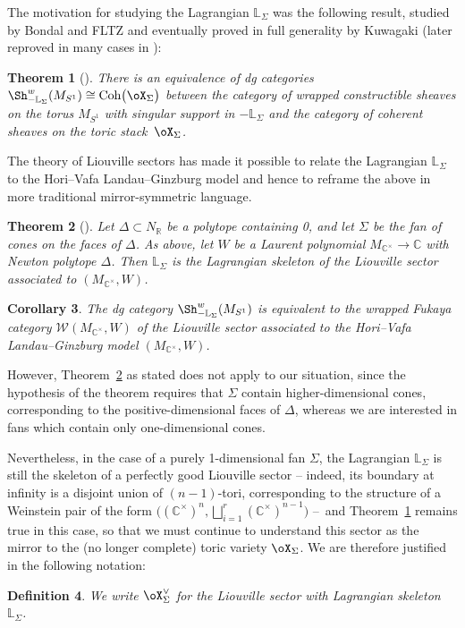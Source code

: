 \documentclass[10pt,a4paper]{amsart}
\numberwithin{equation}{section}
\newtheorem{Theorem}{Theorem}[section]
\newtheorem{Corollary}[Theorem]{Corollary}
\newtheorem{Definition}[Theorem]{Definition}
\def\CC{\mathbb{C}}
\def\LL{\mathbb{L}}
\def\RR{\mathbb{R}}
\def\cW{\mathcal{W}}
\newcommand{\Coh}{\textup{Coh}}
\begin{document}
The motivation for studying the Lagrangian $\LL_\Sigma$ was the following result, studied by Bondal and FLTZ and eventually proved in full generality by Kuwagaki (later reproved in many cases in \cite{Zhou-ccc}):
\begin{Theorem}[\cite{Ku}]\label{thm:ccc}
 There is an equivalence of dg categories $\Sh^w_{-\LL_\Sigma}(M_{S^1})\cong\Coh\big(\oX_\Sigma\big)$ between the category of wrapped constructible sheaves on the torus $M_{S^1}$ with singular support in $-\LL_\Sigma$ and the category of coherent sheaves on the toric stack~$\oX_\Sigma$.
\end{Theorem}

The theory of Liouville sectors has made it possible to relate the Lagrangian $\LL_\Sigma$ to the Hori--Vafa Landau--Ginzburg model and hence to reframe the above in more traditional mirror-symmetric language.
\begin{Theorem}[\cite{GS17,Zhou-skel}]\label{thm:hv-skel}
 Let $\Delta\subset N_\RR$ be a polytope containing 0, and let $\Sigma$ be the fan of cones on the faces of $\Delta$. As above, let $W$ be a Laurent polynomial $M_{\CC^\times}\to \CC$ with Newton polytope $\Delta$.
 Then $\LL_\Sigma$ is the Lagrangian skeleton of the Liouville sector associated to $(M_{\CC^\times},W)$.
\end{Theorem}

{\sloppy\begin{Corollary}
 The dg category $\Sh^w_{-\LL_\Sigma}(M_{S^1})$ is equivalent to the wrapped Fukaya category $\cW(M_{\CC^\times}, W)$ of the Liouville sector associated to the Hori--Vafa Landau--Ginzburg model $(M_{\CC^\times}, W)$.
\end{Corollary}}

However, Theorem~\ref{thm:hv-skel} as stated does not apply to our situation, since the hypothesis of the theorem requires that $\Sigma$ contain higher-dimensional cones, corresponding to the positive-dimensional faces of $\Delta$, whereas we are interested in fans which contain only one-dimensional cones.

Nevertheless, in the case of a purely 1-dimensional fan $\Sigma$, the Lagrangian $\LL_\Sigma$ is still the skeleton of a perfectly good Liouville sector -- indeed, its boundary at infinity is a disjoint union of $(n{-}1)$-tori, corresponding to the structure of a Weinstein pair of the form $\big((\CC^\times)^n,\bigsqcup_{i=1}^r(\CC^\times)^{n-1}\big)$ --~and Theorem~\ref{thm:ccc} remains true in this case, so that we must continue to understand this sector as the mirror to the (no longer complete) toric variety $\oX_\Sigma$. We are therefore justified in the following notation:
\begin{Definition}\label{defn:mirrorsec}
We write $\oX_\Sigma^\vee$ for the Liouville sector with Lagrangian skeleton $\LL_\Sigma$.
\end{Definition}
\end{document}

